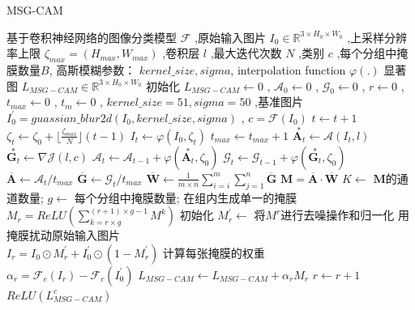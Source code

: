  \begin{algorithm}
	\caption{MSG-CAM}
	\label{alg:1}
	\renewcommand{\algorithmicrequire}{\textbf{输入:}}
	\renewcommand{\algorithmicensure}{\textbf{输出：}}
	\begin{algorithmic}[1]
		\REQUIRE 基于卷积神经网络的图像分类模型 $\mathcal{F} $ ,原始输入图片 $I_0 \in \mathbb{R}^{3\times H_0 \times W_0}$ ,上采样分辨率上限 $\zeta_{max}=(H_{max},W_{max})$ ,卷积层 $l$ ,最大迭代次数 $N$ ,类别 $c$ ,每个分组中掩膜数量$B$, 高斯模糊参数： $kernel\_size,sigma$, interpolation function $\varphi(.)$
		\ENSURE 显著图 $L_{MSG-CAM}\in \mathbb{R}^{3\times H_0 \times W_0}$
		\STATE 初始化 $L_{MSG-CAM} \leftarrow 0$ , $\mathcal{A}_0 \leftarrow 0$ , $\mathcal{G}_0 \leftarrow 0$ , $r \leftarrow 0$ , $t_{max}\leftarrow 0$ , $t_m\leftarrow 0$ , $kernel\_size=51,sigma=50$ ,基准图片 $I^{\prime}_0=guassian\_blur2d(I_0,kernel\_size,sigma)$ , $c=\mathcal{F}(I_0)$
		\STATE $t\leftarrow t+1$
		\STATE $\zeta_t\leftarrow \zeta_0 +\lfloor\frac{\zeta_{max}}{N}\rfloor(t-1)$
		\STATE $I_t\leftarrow \varphi(I_0,\zeta_t)$
		\STATE $t_{max}\leftarrow t_{max}+1$
		\STATE $\overset{*}{\boldsymbol{A}_t}\leftarrow \mathcal{A}(I_t,l)$
		\STATE $\overset{*}{\boldsymbol{G}_t}\leftarrow \nabla\mathcal{J}(l,c)$
		\STATE $\mathcal{A}_t \leftarrow \mathcal{A}_{t-1}+\varphi(\overset{*}{\boldsymbol{A}_t},\zeta_0)$
		\STATE $\mathcal{G}_t \leftarrow \mathcal{G}_{t-1}+\varphi(\overset{*}{\boldsymbol{G}_t},\zeta_0)$
		\ENDIF
		\ENDWHILE
		\STATE $\overline{\bm{A}}\leftarrow \mathcal{A}_t/t_{max}$
		\STATE $\overline{\bm{G}}\leftarrow \mathcal{G}_t/t_{max}$
		\STATE $\overline{\bm{W}}\leftarrow \frac{1}{m\times n}\sum_{i=i}^{m}\sum_{j=1}^{n}\overline{\bm{G}}$
		\STATE $\boldsymbol{M}=\overline{\bm{A}}\cdot\overline{\bm{W}}$
		\STATE $K\leftarrow$ $\boldsymbol{M}$的通道数量;
		\STATE $g\leftarrow$ 每个分组中掩膜数量;
		\STATE 在组内生成单一的掩膜\\ $M_r=ReLU(\sum_{k=r\times g}^{(r+1)\times g-1}M^k)$
		\STATE 初始化 $M^{\prime}_r\leftarrow$ 将$M^r$进行去噪操作和归一化
		\STATE 用掩膜扰动原始输入图片\\$I_r=I_0\odot M^{\prime}_r+I^{\prime}_0\odot (1-M^{\prime}_r)$
		\STATE 计算每张掩膜的权重\\$\alpha_r=\mathcal{F}_c(I_r)-\mathcal{F}_c(I^{\prime}_0)$
		\STATE $L_{MSG-CAM}\leftarrow L_{MSG-CAM}+\alpha_r M_r$
		\STATE $r\leftarrow r+1$
		\ENDWHILE
		\RETURN $ReLU(L^c_{MSG-CAM})$
	\end{algorithmic}
\end{algorithm}
